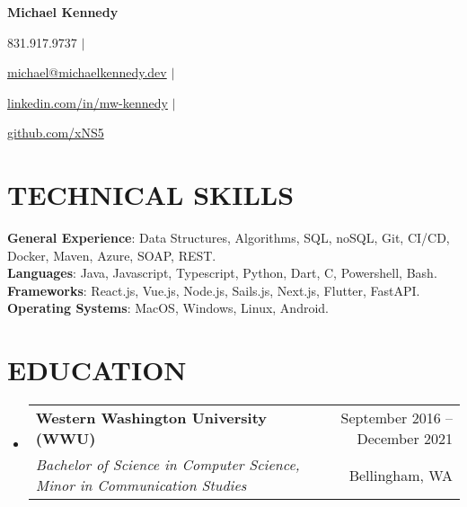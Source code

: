 \documentclass[letterpaper,11pt]{article}
\makeatletter
\newcommand{\resumeSubheading}[4]{
        \vspace{-1pt}\item
        \begin{tabular*}{\textwidth}[t]{l@{\extracolsep{\fill}}r}
            \textbf{#1} & {\color{dark-grey}\small #2}\vspace{1pt}\\ %
            \textit{#3} & {\color{dark-grey} \small #4}\\ %
        \end{tabular*}\vspace{-4pt}
    }
\newcommand{\resumeSubHeadingListStart}{\begin{itemize}[leftmargin=0in, label={}]}
\newcommand{\resumeSubHeadingListEnd}{\end{itemize}}
\newif\ifdisablesymbol
\newcommand{\rendericon}[1]{%
        \ifdisablesymbol
    \else
        #1
    \fi
}
\makeatother
\begin{document}

\begin{center}
    \textbf{\Huge Michael Kennedy} \\ \vspace{5pt}
    \small \rendericon{\faPhone\hspace{2pt}}831.917.9737 \hspace{1pt} $|$
    \hspace{1pt} \rendericon{\faEnvelope\hspace{2pt} }\href{mailto:michael@michaelkennedy.dev}{michael@michaelkennedy.dev} \hspace{1pt} $|$ 
    \hspace{1pt} \rendericon{\faLinkedinSquare\hspace{2pt}} \href{https://www.linkedin.com/in/mw-kennedy}{linkedin.com/in/mw-kennedy} \hspace{1pt}$|$
    \hspace{1pt} \rendericon{\faGithubSquare\hspace{2pt}} \href{https://github.com/xNS5}{github.com/xNS5}
    \\ \vspace{-3pt}
\end{center}

\section{TECHNICAL SKILLS}
\begin{itemize}[leftmargin=0in, label={}]
    \small{\item{
            \textbf{General Experience}{: Data Structures, Algorithms, SQL, noSQL, Git, CI/CD, Docker, Maven, Azure, SOAP, REST.}\\
            \textbf{Languages}{: Java, Javascript, Typescript, Python, Dart, C, Powershell, Bash.} \\
            \textbf{Frameworks}{: React.js, Vue.js, Node.js, Sails.js, Next.js, Flutter, FastAPI.}\\
            \textbf{Operating Systems}{: MacOS, Windows, Linux, Android.}
    }}
\end{itemize}

\section {EDUCATION}
\resumeSubHeadingListStart
\resumeSubheading
{Western Washington University (WWU)}{September 2016 -- December 2021}
{Bachelor of Science in Computer Science, Minor in Communication Studies}{Bellingham, WA} 
\resumeSubHeadingListEnd
\end{document}
